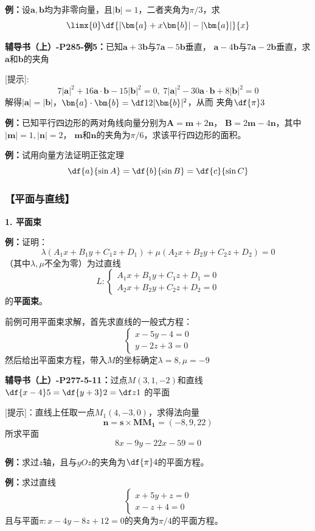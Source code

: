 {\bf 例：}设$\bm{a},\bm{b}$均为非零向量，且$|\bm{b}|=1$，二者夹角为$\pi/3$，求
$$\limx{0}\df{|\bm{a}+x\bm{b}|-|\bm{a}|}{x}$$

{\bf 辅导书（上）-P285-例5：}已知$\bm{a}+3\bm{b}$与$7\bm{a}-5\bm{b}$垂直，
$\bm{a}-4\bm{b}$与$7\bm{a}-2\bm{b}$垂直，求$\bm{a}$和$\bm{b}$的夹角

[提示]:
$$7|\bm{a}|^2+16\bm{a}\cdot\bm{b}-15|\bm{b}|^2=0,\;
7|\bm{a}|^2-30\bm{a}\cdot\bm{b}+8|\bm{b}|^2=0$$
解得$|\bm{a}|=|\bm{b}|$，$\bm{a}\cdot\bm{b}=\df12|\bm{b}|^2$，从而
夹角$\df{\pi}3$

{\bf 例：}已知平行四边形的两对角线向量分别为$\bm{A}=\bm{m}+2\bm{n}$，
$\bm{B}=2\bm{m}-4\bm{n}$，其中$|\bm{m}|=1,|\bm{n}|=2$，
$\bm{m}$和$\bm{n}$的夹角为$\pi/6$，求该平行四边形的面积。

{\bf 例：}试用向量方法证明正弦定理
$$\df{a}{\sin A}=\df{b}{\sin B}=\df{c}{\sin C}$$

\subsubsection{【平面与直线】}

{\bf 1. 平面束}

{\bf 例：}证明：$$\lambda(A_1x+B_1y+C_1z+D_1)+\mu(A_2x+B_2y+C_2z+D_2)=0$$
（其中$\lambda,\mu$不全为零）为过直线
$$L:\left\{\begin{array}{l}
	A_1x+B_1y+C_1z+D_1=0\\
	A_2x+B_2y+C_2z+D_2=0
\end{array}\right.$$
的{\bf 平面束}。

前例可用平面束求解，首先求直线的一般式方程：
$$\left\{\begin{array}{l}x-5y-4=0\\ y-2z+3=0\end{array}\right.$$
然后给出平面束方程，带入$M$的坐标确定$\lambda=8,\mu=-9$

{\bf 辅导书（上）-P277-5-11：}过点$M(3,1,-2)$和直线$\df{x-4}5=\df{y+3}2=\df z1$
的平面

[提示]：直线上任取一点$M_1(4,-3,0)$，求得法向量
$$\bm{n}=\bm{s}\times\bm{MM_1}=(-8,9,22)$$
所求平面
$$8x-9y-22x-59=0$$

{\bf 例：}求过$z$轴，且与$yOz$的夹角为$\df{\pi}4$的平面方程。

{\bf 例：}求过直线
$$\left\{\begin{array}{l}
	x+5y+z=0\\
	x-z+4=0
\end{array}\right.$$
且与平面$\pi:x-4y-8z+12=0$的夹角为$\pi/4$的平面方程。

